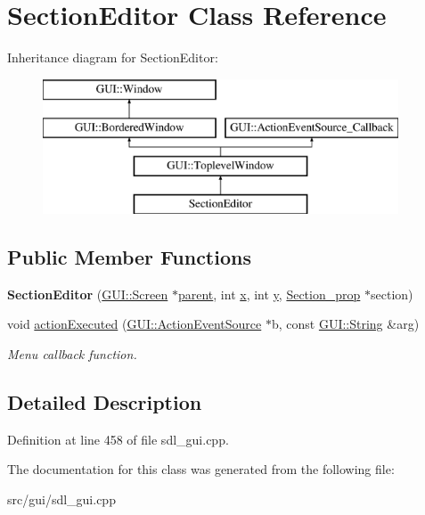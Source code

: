 \hypertarget{classSectionEditor}{\section{Section\-Editor Class Reference}
\label{classSectionEditor}
}
Inheritance diagram for Section\-Editor\-:\begin{figure}[H]
\begin{center}
\leavevmode
\includegraphics[height=4.000000cm]{classSectionEditor}
\end{center}
\end{figure}
\subsection*{Public Member Functions}
\begin{DoxyCompactItemize}
\item 
\hypertarget{classSectionEditor_a5b4b01aaafcd5cb87b20e5aa7cab7f87}{{\bfseries Section\-Editor} (\hyperlink{classGUI_1_1Screen}{G\-U\-I\-::\-Screen} $\ast$\hyperlink{classGUI_1_1Window_a2e593ff65e7702178d82fe9010a0b539}{parent}, int \hyperlink{classGUI_1_1Window_a6ca6a80ca00c9e1d8ceea8d3d99a657d}{x}, int \hyperlink{classGUI_1_1Window_a0ee8e923aff2c3661fc2e17656d37adf}{y}, \hyperlink{classSection__prop}{Section\-\_\-prop} $\ast$section)}\label{classSectionEditor_a5b4b01aaafcd5cb87b20e5aa7cab7f87}

\item 
\hypertarget{classSectionEditor_affef3df8632e3d7cef272a5cbcd4728f}{void \hyperlink{classSectionEditor_affef3df8632e3d7cef272a5cbcd4728f}{action\-Executed} (\hyperlink{classGUI_1_1ActionEventSource}{G\-U\-I\-::\-Action\-Event\-Source} $\ast$b, const \hyperlink{classGUI_1_1String}{G\-U\-I\-::\-String} \&arg)}\label{classSectionEditor_affef3df8632e3d7cef272a5cbcd4728f}

\begin{DoxyCompactList}\small\item\em Menu callback function. \end{DoxyCompactList}\end{DoxyCompactItemize}


\subsection{Detailed Description}


Definition at line 458 of file sdl\-\_\-gui.\-cpp.



The documentation for this class was generated from the following file\-:\begin{DoxyCompactItemize}
\item 
src/gui/sdl\-\_\-gui.\-cpp\end{DoxyCompactItemize}
